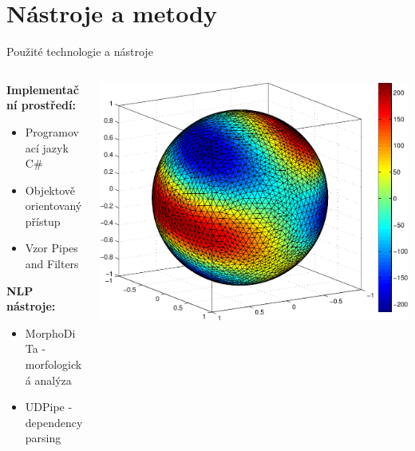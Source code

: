\documentclass[lualatex,hyperref={pdfencoding=auto}]{beamer}
\begin{document}
\section{Nástroje a metody}
\begin{frame}{Použité technologie a nástroje}
  \begin{columns}
    \begin{column}{0.5\textwidth}
      \textbf{Implementační prostředí:}
      \begin{itemize}
        \item Programovací jazyk C\#
        \item Objektově orientovaný přístup
        \item Vzor Pipes and Filters
      \end{itemize}
      \vspace{3mm}
      \textbf{NLP nástroje:}
      \begin{itemize}
        \item MorphoDiTa - morfologická analýza
        \item UDPipe - dependency parsing
      \end{itemize}
    \end{column}
    \begin{column}{0.5\textwidth}
      \includegraphics[width=\textwidth]{fig/sphere_mix_real.pdf}
    \end{column}
  \end{columns}
\end{frame}
\end{document}
